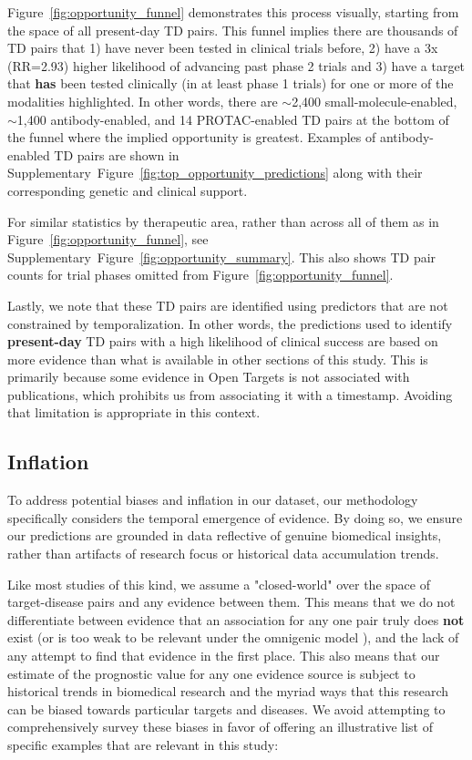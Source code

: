 \documentclass{article}
\begin{document}
Figure~\ref{fig:opportunity_funnel} demonstrates this process visually, starting from the space of all present-day TD pairs. This funnel implies there are thousands of TD pairs that 1) have never been tested in clinical trials before, 2) have a 3x (RR=2.93) higher likelihood of advancing past phase 2 trials and 3) have a target that \textbf{has} been tested clinically (in at least phase 1 trials) for one or more of the modalities highlighted. In other words, there are $\sim$2,400 small-molecule-enabled, $\sim$1,400 antibody-enabled, and 14 PROTAC-enabled TD pairs at the bottom of the funnel where the implied opportunity is greatest. Examples of antibody-enabled TD pairs are shown in Supplementary~Figure~\ref{fig:top_opportunity_predictions} along with their corresponding genetic and clinical support.

For similar statistics by therapeutic area, rather than across all of them as in Figure~\ref{fig:opportunity_funnel}, see Supplementary~Figure~\ref{fig:opportunity_summary}. This also shows TD pair counts for trial phases omitted from Figure~\ref{fig:opportunity_funnel}.

Lastly, we note that these TD pairs are identified using predictors that are not constrained by temporalization. In other words, the predictions used to identify \textbf{present-day} TD pairs with a high likelihood of clinical success are based on more evidence than what is available in other sections of this study. This is primarily because some evidence in Open Targets is not associated with publications, which prohibits us from associating it with a timestamp. Avoiding that limitation is appropriate in this context.

\subsection{Inflation}
\label{sec:results_inflation}

To address potential biases and inflation in our dataset, our methodology specifically considers the temporal emergence of evidence. By doing so, we ensure our predictions are grounded in data reflective of genuine biomedical insights, rather than artifacts of research focus or historical data accumulation trends.

Like most studies of this kind, we assume a "closed-world" \cite{Paliwal2020-hr} over the space of target-disease pairs and any evidence between them. This means that we do not differentiate between evidence that an association for any one pair truly does \textbf{not} exist (or is too weak to be relevant under the omnigenic model \cite{PMID:28622505}), and the lack of any attempt to find that evidence in the first place. This also means that our estimate of the prognostic value for any one evidence source is subject to historical trends in biomedical research and the myriad ways that this research can be biased towards particular targets and diseases. We avoid attempting to comprehensively survey these biases in favor of offering an illustrative list of specific examples that are relevant in this study:
\end{document}
